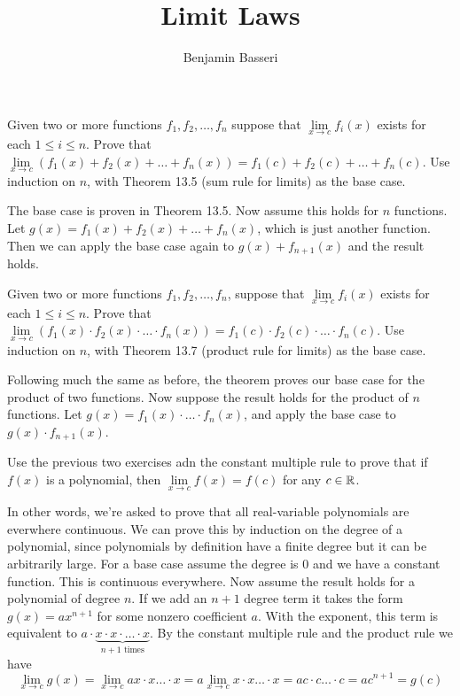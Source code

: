 \documentclass{article}
\title{Limit Laws}
\author{Benjamin Basseri}
\begin{document}
\maketitle
\begin{problem}
Given two or more functions $f_1, f_2, \ldots, f_n$ suppose that $\lim\limits_{x\to c} f_i(x) $ exists for each $1 \leq i \leq n$. Prove that $\lim\limits_{x\to c} (f_1(x) + f_2(x) + \ldots + f_n(x)) = f_1(c) + f_2(c) + \ldots + f_n(c)$. Use induction on $n$, with Theorem 13.5 (sum rule for limits) as the base case.
\end{problem}

The base case is proven in Theorem 13.5. Now assume this holds for $n$ functions. Let $g(x) = f_1(x) + f_2(x) + \ldots + f_n(x)$, which is just another function. Then we can apply the base case again to $g(x) + f_{n+1}(x)$ and the result holds.

\begin{problem}
Given two or more functions $f_1, f_2, \ldots, f_n$, suppose that $\lim\limits_{x \to c}f_i(x)$ exists for each $1 \leq i \leq n$. Prove that $\lim\limits_{x \to c} (f_1(x) \cdot f_2(x) \cdot \ldots \cdot f_n(x)) = f_1(c) \cdot f_2(c) \cdot \ldots \cdot f_n(c)$. Use induction on $n$, with Theorem 13.7 (product rule for limits) as the base case.
\end{problem}

Following much the same as before, the theorem proves our base case for the product of two functions. Now suppose the result holds for the product of $n$ functions. Let $g(x) = f_1(x)\cdot \ldots \cdot f_n(x)$, and apply the base case to $g(x) \cdot f_{n+1}(x)$.

\begin{problem}
Use the previous two exercises adn the constant multiple rule to prove that if $f(x)$ is a polynomial, then $\lim\limits_{x \to c} f(x) = f(c)$ for any $c \in \mathbb{R}$.
\end{problem}

In other words, we're asked to prove that all real-variable polynomials are everwhere continuous. We can prove this by induction on the degree of a polynomial, since polynomials by definition have a finite degree but it can be arbitrarily large. For a base case assume the degree is 0 and we have a constant function. This is continuous everywhere. Now assume the result holds for a polynomial of degree $n$. If we add an $n+1$ degree term it takes the form $g(x) = ax^{n+1}$ for some nonzero coefficient $a$. With the exponent, this term is equivalent to $a\cdot \underbrace{x \cdot x \cdot \ldots \cdot x}_{\text{$n + 1$ times}}$. By the constant multiple rule and the product rule we have
$$\lim_{x \to c} g(x) = \lim_{x \to c} a x \cdot x \ldots \cdot x = a \lim_{x \to c} x \cdot x \ldots \cdot x = a c \cdot c \ldots \cdot c = a c^{n+1} = g(c)$$
\end{document}
